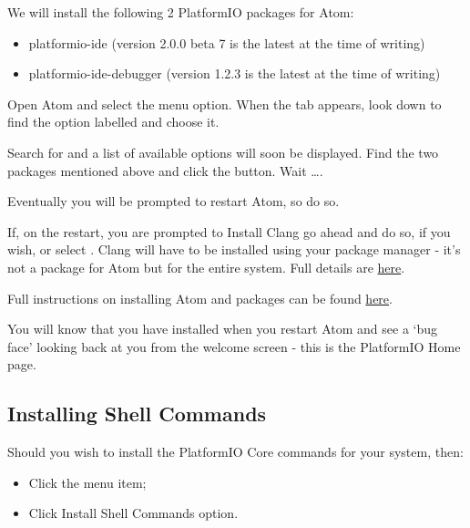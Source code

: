 We will install the following 2 PlatformIO packages for Atom:

\begin{itemize}
\item
  platformio-ide (version 2.0.0 beta 7 is the latest at the time of
  writing)
\item
  platformio-ide-debugger (version 1.2.3 is the latest at the time of
  writing)
\end{itemize}

Open Atom and select the  menu option. When the  tab appears, look down to find the option labelled  and choose it.

Search for  and a list of available options will soon be displayed. Find the two packages mentioned above and click the  button. Wait \ldots{}.

Eventually you will be prompted to restart Atom, so do so.

If, on the restart, you are prompted to Install Clang go ahead and do so, if you wish, or select . Clang will have to be installed using your package manager - it's not a package for Atom but for the entire system. Full details are \href{http://docs.platformio.org/en/latest/ide/atom.html\#ii-clang-for-intelligent-code-completion}{here}.

Full instructions on installing Atom and  packages can be found \href{http://docs.platformio.org/en/latest/ide/atom.html\#clang-for-intelligent-code-completion}{here}.

You will know that you have installed  when you restart Atom and see a `bug face' looking back at you from the  welcome screen - this is the PlatformIO Home page.

\subsection{Installing Shell Commands}\label{installing-shell-commands}

Should you wish to install the PlatformIO Core commands for your system, then:

\begin{itemize}
	\item Click the  menu item;
	\item Click Install Shell Commands option.
\end{itemize}

